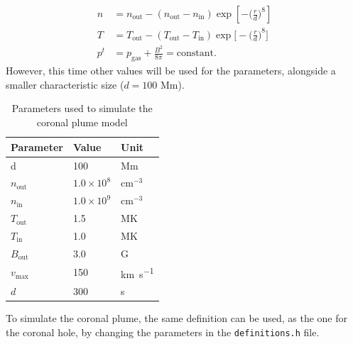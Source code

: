 \documentclass[a4paper]{article}
\numberwithin{figure}{section}
\numberwithin{equation}{section}
\begin{document}
\begin{align*}
    n &= n_{\text{out}} - (n_{\text{out}}-n_{\text{in}})\exp\left[-\bigg(\frac{r}{d}\bigg)^8\right]\\
    T &= T_{\text{out}} - (T_{\text{out}}-T_{\text{in}})\exp\bigg[-\bigg(\frac{r}{d}\bigg)^8\bigg]\\
     p^t &= p_{\text{gas}} + \frac{B^2}{8\pi} = \text{constant}.
\end{align*}
However, this time other values will be used for the parameters, alongside a smaller characteristic size ($d = 100$ Mm).
\begin{table}[H]
    \centering
    \caption{Parameters used to simulate the coronal plume model}
    \label{tab:coronal_plume}
    \begin{tabular}{|l|l|l|}
    \hline
    \textbf{Parameter}             & \textbf{Value}                                  & \textbf{Unit}              \\ \hline
    d                              & 100                                             & Mm                         \\ \hline
    $n_\text{out}$ & $1.0 \times 10^8$ & $\text{cm}^{-3}$ \\ \hline
    $n_\text{in}$                              & $1.0 \times 10^9$                                               & $\text{cm}^{-3}$                          \\ \hline
    $T_\text{out}$                              & 1.5                                               & MK                          \\ \hline
    $T_\text{in}$                              & 1.0                                               & MK                          \\ \hline
    $B_\text{out}$                              & 3.0                                               & G                          \\ \hline
    $v_\text{max}$ 			 	& 150						& \si{\kilo\metre \per \second}  \\ \hline
    $d$						& 300						& \si{\second} \\ \hline
\end{tabular}
\end{table}
To simulate the coronal plume, the same definition can be used, as the one for the coronal hole, by changing the parameters in the \texttt{definitions.h} file.\\
\end{document}

